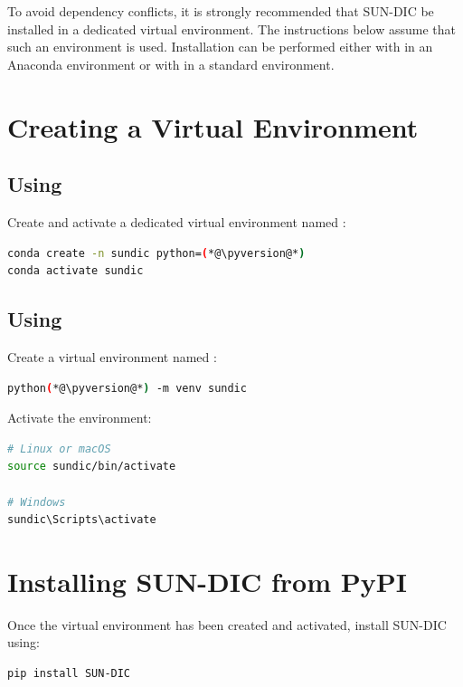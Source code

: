 To avoid dependency conflicts, it is strongly recommended that SUN-DIC be installed in a dedicated virtual environment. The instructions below assume that such an environment is used. Installation can be performed either with  in an Anaconda environment or with  in a standard  environment.

\section{Creating a Virtual Environment}

\subsection{Using }

Create and activate a dedicated virtual environment named :

\begin{lstlisting}[language=bash]
conda create -n sundic python=(*@\pyversion@*)
conda activate sundic
\end{lstlisting}

\subsection{Using }

Create a virtual environment named :

\begin{lstlisting}[language=bash]
python(*@\pyversion@*) -m venv sundic
\end{lstlisting}

\noindent
Activate the environment:

\begin{lstlisting}[language=bash]
# Linux or macOS
source sundic/bin/activate

# Windows
sundic\Scripts\activate
\end{lstlisting}

\section{Installing SUN-DIC from PyPI}

Once the virtual environment has been created and activated, install SUN-DIC using:

\begin{lstlisting}[language=bash]
pip install SUN-DIC
\end{lstlisting}

